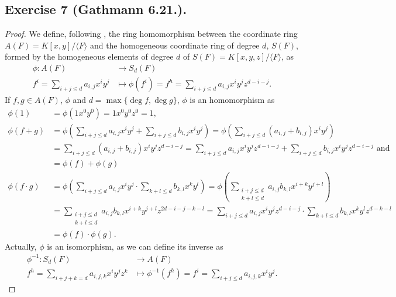 \documentclass[11pt,a4paper]{article}
\begin{document}
\newpage
\subsection*{Exercise 7 (Gathmann 6.21.).}
\begin{proof}
We define, following \cite[Construction 3.13]{gath}, the ring homomorphism between the coordinate ring $ A(F) = K[x, y] / \langle F \rangle $ and the homogeneous coordinate ring of degree $ d $, $ S(F)$, formed by the homogeneous elements of degree $ d $ of $ S(F) = K[x, y, z] / \langle F \rangle$, as
  \begin{align*}
    \phi: A(F) &\longrightarrow S_d(F) \\
    f^i = \sum_{i+j \leq d} a_{i,j} x^i y^j &\longmapsto \phi (f^i) = f^h = \sum_{i+j \leq d} a_{i,j} x^i y^j z^{d-i-j}.
  \end{align*}
  If $f, g \in A(F) $, $\phi $ and $ d = \operatorname{max}\{\operatorname{deg}f, \operatorname{deg}g\} $, $\phi$ is an homomorphism as
  \begin{align*}
    \phi(1) &= \phi(1 x^0 y^0) = 1 x^0 y^0 z^0 = 1, \\
    \phi(f + g) &= \phi \left(\sum_{i + j \leq d} a_{i,j} x^i y^j + \sum_{i + j \leq d} b_{i,j} x^i y^j \right) = \phi \left(\sum_{i + j \leq d} (a_{i,j} + b_{i,j})  x^i y^j \right) \\
    &= \sum_{i + j \leq d} (a_{i,j} + b_{i,j})  x^i y^j z^{d-i-j} = \sum_{i + j \leq d} a_{i,j}  x^i y^j z^{d-i-j} + \sum_{i + j \leq d} b_{i,j}  x^i y^j z^{d-i-j} \text{ and} \\
    &= \phi(f) + \phi(g)\\ 
    \phi(f \cdot g) &= \phi\left(\sum_{i + j \leq d} a_{i,j} x^i y^j \cdot \sum_{k + l \leq d} b_{k,l} x^k y^l\right) = \phi\left(\sum_{\substack{i + j \leq d\\k + l \leq d}} a_{i,j} b_{k,l} x^{i+k} y^{j+l} \right) \\
    &= \sum_{\substack{i + j \leq d\\k + l \leq d}} a_{i,j} b_{k,l} x^{i+k} y^{j+l} z^{2d-i-j-k-l} = \sum_{i + j \leq d} a_{i,j} x^{i} y^{j} z^{d-i-j} \cdot \sum_{k + l \leq d} b_{k,l} x^{k} y^{l} z^{d-k-l} \\
    &= \phi(f) \cdot \phi(g).
  \end{align*}
  Actually, $ \phi $ is an isomorphism, as we can define its inverse as
  \begin{align*}
    \phi^{-1}: S_d(F) &\longrightarrow A(F) \\
    f^h = \sum_{i+j+k = d} a_{i,j,k} x^i y^j z^k &\longmapsto \phi^{-1} (f^h) = f^i = \sum_{i+j \leq d} a_{i,j,k} x^i y^j.

\end{align*}
\end{proof}
\end{document}
